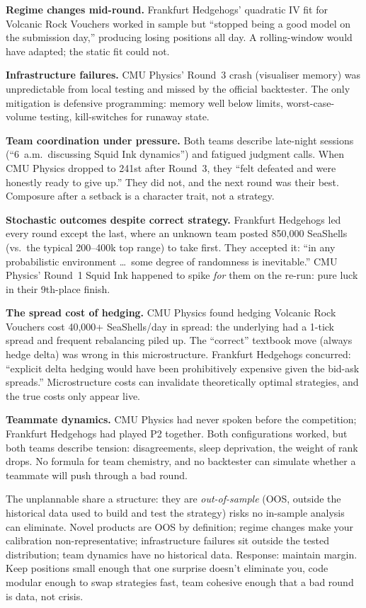 \textbf{Regime changes mid-round.}  Frankfurt Hedgehogs' quadratic
IV fit for Volcanic Rock Vouchers worked in sample but ``stopped
being a good model on the submission day,'' producing losing
positions all day.  A rolling-window would have adapted; the
static fit could not.

\textbf{Infrastructure failures.}  CMU Physics' Round~3 crash
(visualiser memory) was unpredictable from local testing and
missed by the official backtester.  The only mitigation is
defensive programming: memory well below limits, worst-case-volume
testing, kill-switches for runaway state.

\textbf{Team coordination under pressure.}  Both teams describe
late-night sessions (``6~a.m.\ discussing Squid Ink dynamics'')
and fatigued judgment calls.  When CMU Physics dropped to 241st
after Round~3, they ``felt defeated and were honestly ready to
give up.''  They did not, and the next round was their best.
Composure after a setback is a character trait, not a strategy.

\textbf{Stochastic outcomes despite correct strategy.}  Frankfurt
Hedgehogs led every round except the last, where an unknown team
posted 850{,}000 SeaShells (vs.\ the typical 200--400k top range)
to take first.  They accepted it: ``in any probabilistic
environment \ldots\ some degree of randomness is inevitable.''
CMU Physics' Round~1 Squid Ink happened to spike \emph{for} them
on the re-run: pure luck in their 9th-place finish.

\textbf{The spread cost of hedging.}  CMU Physics found hedging
Volcanic Rock Vouchers cost 40{,}000+ SeaShells/day in spread: the
underlying had a 1-tick spread and frequent rebalancing piled up.
The ``correct'' textbook move (always hedge delta) was wrong in
this microstructure.  Frankfurt Hedgehogs concurred: ``explicit
delta hedging would have been prohibitively expensive given the
bid-ask spreads.''  Microstructure costs can invalidate
theoretically optimal strategies, and the true costs only appear
live.

\textbf{Teammate dynamics.}  CMU Physics had never spoken before
the competition; Frankfurt Hedgehogs had played P2 together.
Both configurations worked, but both teams describe tension:
disagreements, sleep deprivation, the weight of rank drops.
No formula for team chemistry, and no backtester can simulate
whether a teammate will push through a bad round.

\begin{intuitionbox}
The unplannable share a structure: they are \emph{out-of-sample}
(OOS, outside the historical data used to build and test the
strategy) risks no in-sample analysis can eliminate.  Novel products are
OOS by definition; regime changes make your calibration
non-representative; infrastructure failures sit outside the tested
distribution; team dynamics have no historical data.  Response:
maintain margin.  Keep positions small enough that one surprise
doesn't eliminate you, code modular enough to swap strategies
fast, team cohesive enough that a bad round is data, not crisis.
\end{intuitionbox}


